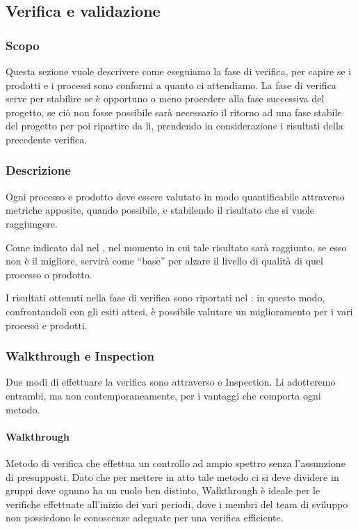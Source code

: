	\subsection{Verifica e validazione}\label{Verifica}

		\subsubsection{Scopo}
		Questa sezione vuole descrivere come eseguiamo la fase di verifica, per capire se i prodotti e i processi sono conformi a quanto ci attendiamo.
		La fase di verifica serve per stabilire se è opportuno o meno procedere alla fase successiva del progetto, se ciò non fosse possibile sarà necessario il
		ritorno ad una fase stabile del progetto per poi ripartire da lì, prendendo in considerazione i risultati della precedente verifica.


		\subsubsection{Descrizione}
		Ogni processo e prodotto deve essere valutato in modo quantificabile attraverso metriche apposite, quando possibile, e stabilendo il risultato che si vuole
		raggiungere.

		Come indicato dal  nel \PdQd, nel momento in cui tale risultato sarà raggiunto, se esso non è il migliore,
		servirà come ``base'' per alzare il livello di qualità di quel processo o prodotto.

		I risultati ottenuti nella fase di verifica sono riportati nel \PdQd: in questo modo, confrontandoli con gli esiti attesi,
		è possibile valutare un miglioramento per i vari processi e prodotti.

		\subsubsection{Walkthrough e Inspection}
		Due modi di effettuare la verifica sono attraverso  e Inspection.
		Li adotteremo entrambi, ma non contemporaneamente, per i vantaggi che comporta ogni metodo.

			\paragraph{Walkthrough}
			Metodo di verifica che effettua un controllo ad ampio spettro senza l’assunzione di presupposti. Dato che per mettere in atto tale metodo ci
			si deve dividere in gruppi dove ognuno ha un ruolo ben distinto, Walkthrough è ideale per le verifiche effettuate all'inizio dei vari periodi,
			dove i membri del team di sviluppo non possiedono le conoscenze adeguate per una verifica efficiente.


